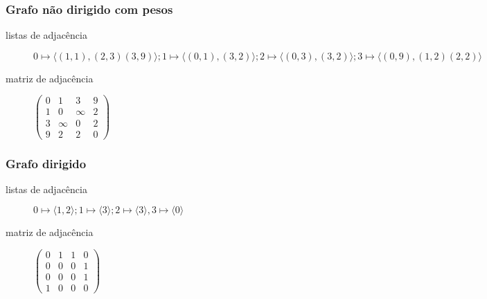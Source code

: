 \documentclass{beamer}
\begin{document}
\begin{frame}
\frametitle{Grafo não dirigido com pesos}

\begin{center}
\end{center}

\begin{description}

\item[listas de adjacência] $0 \mapsto \langle (1,1), (2,3) (3,9) \rangle; 
1 \mapsto \langle (0, 1), (3, 2) \rangle;
2 \mapsto \langle (0, 3), (3, 2) \rangle; 
3 \mapsto \langle (0, 9), (1, 2) (2, 2) \rangle$

\item[matriz de adjacência] $\left( 
\begin{array}{cccc}
0 & 1 & 3 & 9 \\
1 & 0 & \infty & 2 \\
3 & \infty & 0 & 2 \\
9 & 2 & 2 & 0
\end{array}
\right)
$
\end{description}
\end{frame}

\begin{frame}
\frametitle{Grafo dirigido}

\begin{center}
\end{center}

\begin{description}

\item[listas de adjacência] $0 \mapsto \langle 1, 2 \rangle; 1 \mapsto \langle 3 \rangle;
2 \mapsto \langle 3 \rangle, 3 \mapsto \langle 0\rangle$

\item[matriz de adjacência] $\left( 
\begin{array}{cccc}
0 & 1 & 1 & 0 \\
0 & 0 & 0 & 1 \\
0 & 0 & 0 & 1 \\
1 & 0 & 0 & 0
\end{array}
\right)
$
\end{description}
\end{frame}
\end{document}
